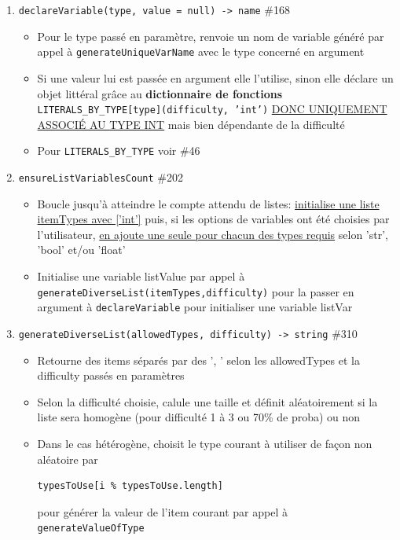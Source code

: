 \documentclass[11pt,a4paper]{article}
\begin{document}
\begin{enumerate}
    \item \texttt{declareVariable(type, value = null) -> name} \#168
    \begin{itemize}
        \item Pour le type passé en paramètre, renvoie un nom de variable généré par appel à \texttt{generateUniqueVarName} avec le type concerné en argument
        \item Si une valeur lui est passée en argument elle l'utilise, sinon elle déclare un objet littéral grâce au \textbf{dictionnaire de fonctions} \texttt{LITERALS\_BY\_TYPE[type](difficulty, 'int')} \underline{DONC UNIQUEMENT ASSOCIÉ AU TYPE INT} mais bien dépendante de la difficulté
        \item Pour \texttt{LITERALS\_BY\_TYPE} voir \#46
    \end{itemize}
    
    \item \texttt{ensureListVariablesCount} \#202
    \begin{itemize}
        \item Boucle jusqu'à atteindre le compte attendu de listes: \underline{initialise une liste itemTypes avec ['int']} puis, si les options de variables ont été choisies par l'utilisateur, \underline{en ajoute une seule pour chacun des types requis} selon 'str', 'bool' et/ou 'float'
        \item Initialise une variable listValue par appel à \texttt{generateDiverseList(itemTypes,difficulty)} pour la passer en argument à \texttt{declareVariable} pour initialiser une variable listVar
    \end{itemize}
    
    \item \texttt{generateDiverseList(allowedTypes, difficulty) -> string} \#310
    \begin{itemize}
        \item Retourne des items séparés par des ', ' selon les allowedTypes et la difficulty passés en paramètres
        \item Selon la difficulté choisie, calule une taille et définit aléatoirement si la liste sera homogène (pour difficulté 1 à 3 ou 70\% de proba) ou non
        \item Dans le cas hétérogène, choisit le type courant à utiliser de façon non aléatoire par 
\begin{verbatim}
typesToUse[i % typesToUse.length] 
\end{verbatim}
pour générer la valeur de l'item courant par appel à \texttt{generateValueOfType}
    \end{itemize}


\end{enumerate}
\end{document}

